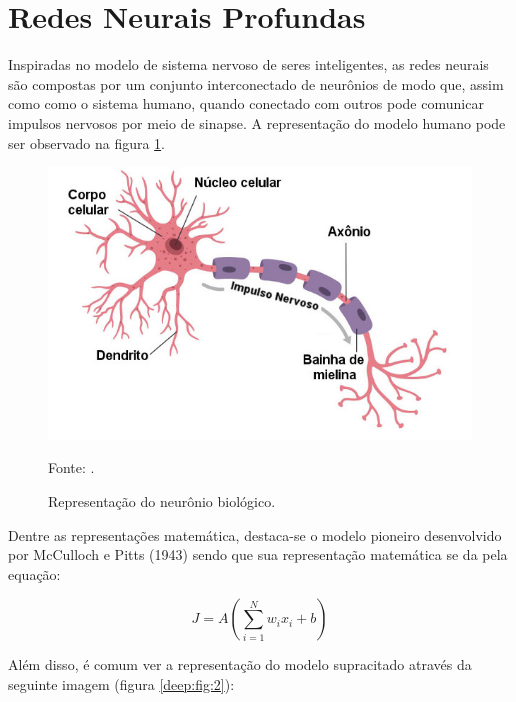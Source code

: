 \newpage
\section{Redes Neurais Profundas}
\label{deep:deep}

Inspiradas no modelo de sistema nervoso de seres inteligentes, as redes neurais são compostas por um conjunto interconectado de neurônios de modo que, assim como como o sistema humano, quando conectado com outros pode comunicar impulsos nervosos por meio de sinapse. A representação do modelo humano pode ser observado na figura \ref{deep:fig:1}.

\begin{figure}[H]
    \centering
    \caption{Representação do neurônio biológico.}
    \includegraphics[width=1\linewidth]{recursos/imagens/deep/neuronio.jpg}
    \label{deep:fig:1}

    \vspace*{1 cm}
    Fonte: \cite{Neuronio:Educacao}.
\end{figure}

Dentre as representações matemática, destaca-se o modelo pioneiro desenvolvido por McCulloch e Pitts (1943) \cite{mcculloch1943logical} sendo que sua representação matemática se da pela equação:

\begin{equation}
    \label{deep:eq:1}
    J = A(\sum_{i = 1}^{N} w_i x_i +b)
\end{equation}

Além disso, é comum ver a representação do modelo supracitado através da seguinte imagem (figura \ref{deep:fig:2}):

